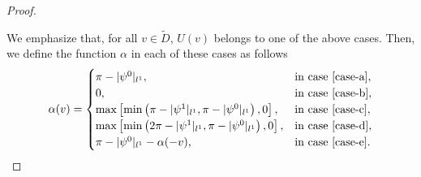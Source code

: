 \documentclass{article}
\theoremstyle{remark}
\theoremstyle{prpart}
\begin{document}
\begin{proof}
\begin{enumerate}
\end{enumerate}
We emphasize that, for all $v\in\tilde D$, $U(v)$ belongs to one of the above cases. 
Then, we define the function $\alpha$ in each of these cases as follows
\begin{equation}\label{eq:pr-def-alpha}
  \alpha(v)=
  \begin{cases}
    \pi-|\psi^0|_{l^1},&\text{in case \ref{case-a}},\\
    0,&\text{in case \ref{case-b}},\\
    \max\left[\min\left(\pi-|\psi^1|_{l^1},\pi-|\psi^0|_{l^1}\right),0\right],&\text{in case \ref{case-c}},\\
    \max\left[\min\left(2\pi-|\psi^1|_{l^1},\pi-|\psi^0|_{l^1}\right),0\right],&\text{in case \ref{case-d}},\\
    \pi-|\psi^0|_{l^1}-\alpha(-v),&\text{in case \ref{case-e}}.               
  \end{cases}
\end{equation}


\end{proof}
\end{document}
